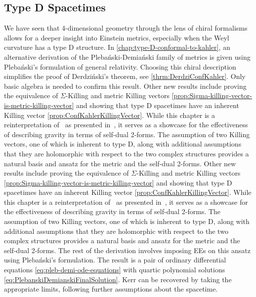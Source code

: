\documentclass[10pt]{report}
\newcommand{\pleb}[0]{Pleba\'nski}
\newcommand{\demi}[0]{Demia\'nski}
\newcommand{\derd}[0]{Derdzi\'nski}
\theoremstyle{definition}
\begin{document}
    \subsection{Type D Spacetimes}

    We have seen that 4-dimensional geometry through the lens of chiral formalisms allows for a deeper insight into Einstein metrics, especially when the Weyl curvature has a type D structure. In \cref{chap:type-D-conformal-to-kahler}, an alternative derivation of the \pleb{}-\demi{} family of metrics is given using \pleb{}'s formulation of general relativity. Choosing this chiral description simplifies the proof of \derd{}'s theorem, see \cref{thrm:DerdziConfKahler}. Only basic algebra is needed to confirm this result. Other new results include proving the equivalence of $\Sigma$-Killing and metric Killing vectors \cref{prop:Sigma-killing-vector-is-metric-killing-vector} and showing that type D spacetimes have an inherent Killing vector \cref{prop:ConfKahlerKillingVector}. While this chapter is a reinterpretation of~\cite{AmbitoricGeomeAposto2013} as presented in~\cite{Kerr_metric_fro_Krasno_2024}, it serves as a showcase for the effectiveness of describing gravity in terms of self-dual 2-forms. The assumption of two Killing vectors, one of which is inherent to type D, along with additional assumptions that they are holomorphic with respect to the two complex structures provides a natural basis and ansatz for the metric and the self-dual 2-forms. Other new results include proving the equivalence of $\Sigma$-Killing and metric Killing vectors \cref{prop:Sigma-killing-vector-is-metric-killing-vector} and showing that type D spacetimes have an inherent Killing vector \cref{prop:ConfKahlerKillingVector}. While this chapter is a reinterpretation of~\cite{AmbitoricGeomeAposto2013} as presented in~\cite{Kerr_metric_fro_Krasno_2024}, it serves as a showcase for the effectiveness of describing gravity in terms of self-dual 2-forms. The assumption of two Killing vectors, one of which is inherent to type D, along with additional assumptions that they are holomorphic with respect to the two complex structures provides a natural basis and ansatz for the metric and the self-dual 2-forms. The rest of the derivation involves imposing EEs on this ansatz using \pleb{}'s formulation. The result is a pair of ordinary differential equations \cref{eq:pleb-demi-ode-equations} with quartic polynomial solutions \cref{eq:PlebanskiDemianskiFinalSolution}. Kerr can be recovered by taking the appropriate limits, following further assumptions about the spacetime.
    
\end{document}
